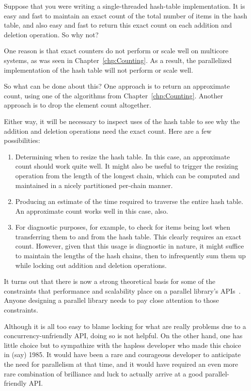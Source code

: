 Suppose that you were writing a single-threaded hash-table implementation.
It is easy and fast to maintain an exact count of the total number of items
in the hash table, and also easy and fast to return this exact count on each
addition and deletion operation.
So why not?

One reason is that exact counters do not perform or scale well on
multicore systems, as was
seen in Chapter~\ref{chp:Counting}.
As a result, the parallelized implementation of the hash table will not
perform or scale well.

So what can be done about this?
One approach is to return an approximate count, using one of the algorithms
from Chapter~\ref{chp:Counting}.
Another approach is to drop the element count altogether.

Either way, it will be necessary to inspect uses of the hash table to see
why the addition and deletion operations need the exact count.
Here are a few possibilities:

\begin{enumerate}
\item	Determining when to resize the hash table.
	In this case, an approximate count should work quite well.
	It might also be useful to trigger the resizing operation from
	the length of the longest chain, which can be computed and
	maintained in a nicely partitioned per-chain manner.
\item	Producing an estimate of the time required to traverse the
	entire hash table.
	An approximate count works well in this case, also.
\item	For diagnostic purposes, for example, to check for items being
	lost when transferring them to and from the hash table.
	This clearly requires an exact count.
	However, given that this usage is diagnostic in nature, it might
	suffice to maintain the lengths of the hash chains, then to
	infrequently sum them
	up while locking out addition and deletion operations.
\end{enumerate}

It turns out that there is now a strong theoretical basis for some of the
constraints that performance and scalability place on a parallel library's
APIs~\cite{HagitAttiya2011LawsOfOrder,Attiya:2011:LOE:1925844.1926442,PaulEMcKenney2011SNC}.
Anyone designing a parallel library needs to pay close attention to
those constraints.

Although it is all too easy to blame locking for what are really problems
due to a concurrency-unfriendly API, doing so is not helpful.
On the other hand, one has little choice but to sympathize with the
hapless developer who made this choice in (say) 1985.
It would have been a rare and courageous developer to anticipate the
need for parallelism at that time, and it would have required an
even more rare combination of brilliance and luck to actually arrive
at a good parallel-friendly API\@.

